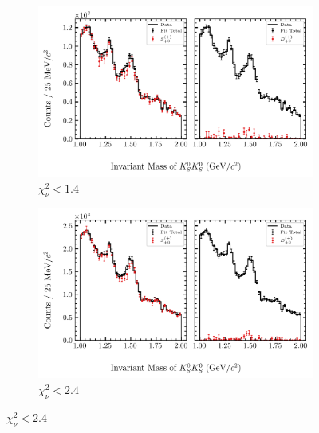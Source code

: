 \begin{figure}[htbp]
    \centering
    \begin{subfigure}{0.45\textwidth}
        \includegraphics[width=\linewidth]{figures/binned_fit_chisqdof_1.4_splot_D_1s_2b_phase_factor_waves487_uncertainty_bootstrap-CI-BC.png}
        \caption{$\chi^2_\nu < 1.4$}
    \end{subfigure}
    \hfill
    \begin{subfigure}{0.45\textwidth}
        \includegraphics[width=\linewidth]{figures/binned_fit_chisqdof_2.4_splot_D_1s_2b_phase_factor_waves487_uncertainty_bootstrap-CI-BC.png}
        \caption{$\chi^2_\nu < 2.4$}
    \end{subfigure}

    \vspace{1em}


\end{figure}

